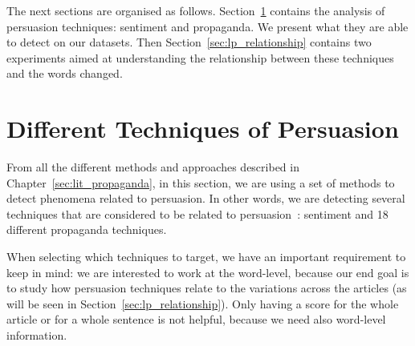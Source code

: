 
The next sections are organised as follows. Section~\ref{sec:lp_techniques} contains the analysis of persuasion techniques: sentiment and propaganda.
We present what they are able to detect on our datasets. %
Then Section~\ref{sec:lp_relationship} contains two experiments aimed at understanding the relationship between these techniques and the words changed.%

\section{Different Techniques of Persuasion}
\label{sec:lp_techniques}


From all the different methods and approaches described in Chapter~\ref{sec:lit_propaganda}, in this section, we are using a set of methods to detect phenomena related to persuasion. %
In other words, we are detecting several techniques that are considered 
to be related to persuasion~\citep{gass2018persuasion}: sentiment and 18 different propaganda techniques.%


When selecting which techniques to target, we have an important requirement to keep in mind: we are interested to work at the word-level, because our end goal is to study how persuasion techniques relate to the variations across the articles (as will be seen in Section~\ref{sec:lp_relationship}). Only having a score for the whole article or for a whole sentence is not helpful, because we need also word-level information.

